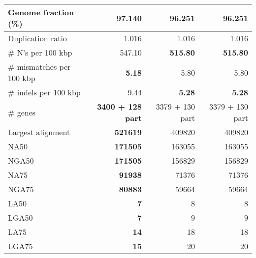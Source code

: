\documentclass[12pt,a4paper]{article}
\begin{document}
\begin{table}[ht]
\begin{center}
\begin{tabular}{|l*{3}{|r}|}
Genome fraction (\%) & {\bf 97.140} & 96.251 & 96.251 \\ \hline
Duplication ratio & 1.016 & 1.016 & 1.016 \\ \hline
\# N's per 100 kbp & 547.10 & {\bf 515.80} & {\bf 515.80} \\ \hline
\# mismatches per 100 kbp & {\bf 5.18} & 5.80 & 5.80 \\ \hline
\# indels per 100 kbp & 9.44 & {\bf 5.28} & {\bf 5.28} \\ \hline
\# genes & {\bf 3400 + 128 part} & 3379 + 130 part & 3379 + 130 part \\ \hline
Largest alignment & {\bf 521619} & 409820 & 409820 \\ \hline
NA50 & {\bf 171505} & 163055 & 163055 \\ \hline
NGA50 & {\bf 171505} & 156829 & 156829 \\ \hline
NA75 & {\bf 91938} & 71376 & 71376 \\ \hline
NGA75 & {\bf 80883} & 59664 & 59664 \\ \hline
LA50 & {\bf 7} & 8 & 8 \\ \hline
LGA50 & {\bf 7} & 9 & 9 \\ \hline
LA75 & {\bf 14} & 18 & 18 \\ \hline
LGA75 & {\bf 15} & 20 & 20 \\ \hline
\end{tabular}
\end{center}
\end{table}
\end{document}
